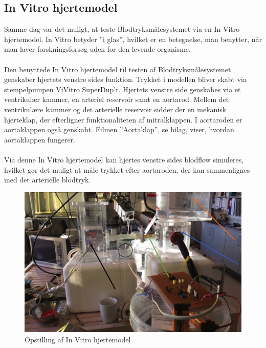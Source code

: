 \subsection{In Vitro hjertemodel}
Samme dag var det muligt, at teste Blodtryksmålesystemet via en In Vitro hjertemodel. In Vitro betyder ”i glas”, hvilket er en betegnelse, man benytter, når man laver forskningsforsøg uden for den levende organisme. \\\\
Den benyttede In Vitro hjertemodel til testen af Blodtryksmålesystemet genskaber hjertets venstre sides funktion. Trykket i modellen bliver skabt via stempelpumpen ViVitro SuperDup'r. Hjertets venstre side genskabes via et ventrikulær kammer, en arteriel reservoir samt en aortarod. Mellem det ventrikulære kammer og det arterielle reservoir sidder der en mekanisk hjerteklap, der efterligner funktionaliteten af mitralklappen. I aortaroden er aortaklappen også genskabt. Filmen ”Aortaklap”, se bilag, viser, hvordan aortaklappen fungerer.\\\\
Via denne In Vitro hjertemodel kan hjertes venstre sides blodflow simuleres, hvilket gør det muligt at måle trykket efter aortaroden, der kan sammenlignes med det arterielle blodtryk.

\begin{figure}[H]
	\centering
	\includegraphics[width=1\textwidth]{Figurer/Snip20151214_98}
	\caption{Opstilling af In Vitro hjertemodel}
\end{figure}

